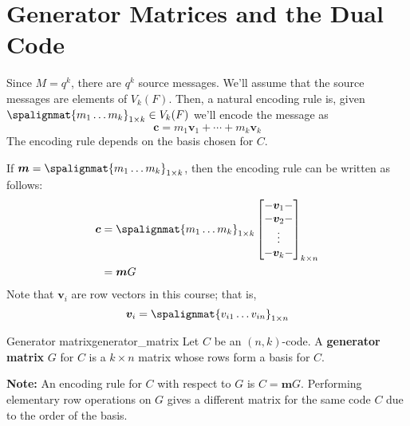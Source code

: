\section{Generator Matrices and the Dual Code}

Since $ M=q^k $, there are $ q^k $ source messages. We'll assume that the source
messages are elements of $ V_k(F) $. Then, a natural encoding rule is,
given $ \spalignmat{m_1 \ldots{} m_k}_{1\times k}\in V_k(F) $ we'll encode the message as
\[ \bm{c}=m_1\bm{v}_1+\cdots+m_k\bm{v}_k \]
The encoding rule depends on the basis chosen for $ C $.

If $ \bm{m}=\spalignmat{m_1 \ldots{} m_k}_{1\times k} $,
then the encoding rule can be written as follows:
\begin{align*}
    \bm{c} & =\spalignmat{m_1 \ldots{} m_k}_{1\times k}
    \begin{bmatrix}
        -\bm{v}_1- \\
        -\bm{v}_2- \\
        \vdots     \\
        -\bm{v}_k-
    \end{bmatrix}_{k\times n}              \\
           & =\bm{m}G
\end{align*}
Note that $ \bm{v}_i $ are row vectors in this course; that is,
\[ \bm{v}_i=\spalignmat{v_{i1} \ldots{} v_{in}}_{1\times n} \]

\begin{Definition}{Generator matrix}{generator_matrix}
    Let $ C $ be an $ (n,k) $-code. A \textbf{generator matrix} $ G $
    for $ C $ is a $ k\times n $ matrix whose rows form a basis for $ C $.
\end{Definition}

\textbf{Note:} An encoding rule for $ C $ with respect to $ G $ is $ C=\bm{m}G $.
Performing elementary row operations on $ G $ gives
a different matrix for the same code $ C $ due to the order of the basis.
